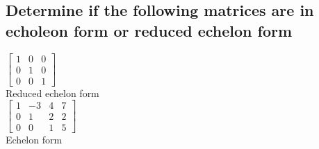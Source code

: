 \documentclass[12pt, a4paper]{article}
\begin{document}
		\subsection{Determine if the following matrices are in echoleon form or reduced echelon form}
			$\begin{bmatrix}
				1 & 0 & 0 \\
				0 & 1 & 0\\
				0 & 0 & 1 
			\end{bmatrix}$\\
			Reduced echelon form\\
			$\begin{bmatrix}
				1 & -3 & 4 & 7 \\
				0 & 1 & 2 & 2\\
				0 & 0 & 1  & 5
			\end{bmatrix}$\\
			Echelon form
			
			
\end{document}
